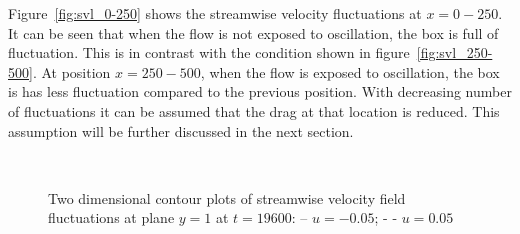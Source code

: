 Figure~\ref{fig:svl_0-250} shows the streamwise velocity fluctuations at $x = 0 - 250$. It can be seen that when the flow is not exposed to oscillation, the box is full of fluctuation. This is in contrast with the condition shown in figure~\ref{fig:svl_250-500}. At position $x = 250 -500$, when the flow is exposed to oscillation, the box is has less fluctuation compared to the previous position. With decreasing number of fluctuations it can be assumed that the drag at that location is reduced. This assumption will be further discussed in the next section.  

\begin{figure}[!h]
  \centering
   \\
  \caption{Two dimensional contour plots of streamwise velocity field fluctuations at plane $y=1$ at $t= 19600$: -- $u=-0.05$; - - $u=0.05$}
  \label{fig:stream_vel_fluct_0-250}
\end{figure}

